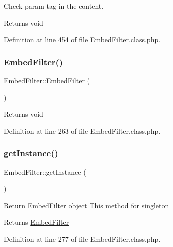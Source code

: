 Check param tag in the content. \begin{DoxyReturn}{Returns}
void 
\end{DoxyReturn}


Definition at line 454 of file Embed\+Filter.\+class.\+php.

\hypertarget{classEmbedFilter_a62571fb9caf83a1ce168e20887709309}{}\label{classEmbedFilter_a62571fb9caf83a1ce168e20887709309} 
\subsubsection{\texorpdfstring{Embed\+Filter()}{EmbedFilter()}}
{\footnotesize\ttfamily Embed\+Filter\+::\+Embed\+Filter (\begin{DoxyParamCaption}{ }\end{DoxyParamCaption})}

\begin{DoxyReturn}{Returns}
void 
\end{DoxyReturn}


Definition at line 263 of file Embed\+Filter.\+class.\+php.

\hypertarget{classEmbedFilter_af8a43e4bc0161225381536c133792463}{}\label{classEmbedFilter_af8a43e4bc0161225381536c133792463} 
\subsubsection{\texorpdfstring{get\+Instance()}{getInstance()}}
{\footnotesize\ttfamily Embed\+Filter\+::get\+Instance (\begin{DoxyParamCaption}{ }\end{DoxyParamCaption})}

Return \hyperlink{classEmbedFilter}{Embed\+Filter} object This method for singleton \begin{DoxyReturn}{Returns}
\hyperlink{classEmbedFilter}{Embed\+Filter} 
\end{DoxyReturn}


Definition at line 277 of file Embed\+Filter.\+class.\+php.

\hypertarget{classEmbedFilter_ab67db1799d818d46e47006592b4e7695}{}\label{classEmbedFilter_ab67db1799d818d46e47006592b4e7695} 
